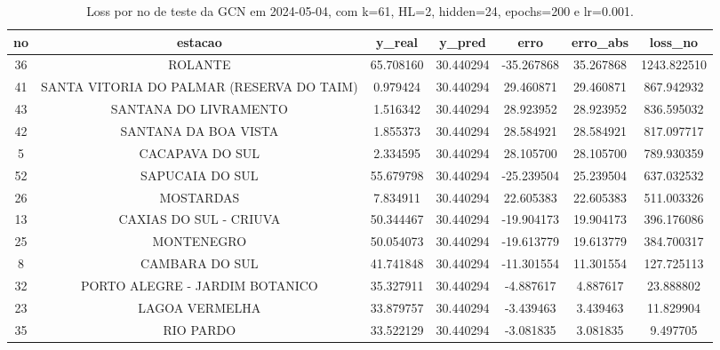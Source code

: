 \begin{table}[h]
\centering
\caption{Loss por no de teste da GCN em 2024-05-04, com k=61, HL=2, hidden=24, epochs=200 e lr=0.001.}
\label{tab:gcn_loss_k61_hl2_h24_e200_d20240504}
\begin{tabular}{ccccccc}
\toprule
no & estacao & y\_real & y\_pred & erro & erro\_abs & loss\_no \\
\midrule
36 & ROLANTE & 65.708160 & 30.440294 & -35.267868 & 35.267868 & 1243.822510 \\
41 & SANTA VITORIA DO PALMAR (RESERVA DO TAIM) & 0.979424 & 30.440294 & 29.460871 & 29.460871 & 867.942932 \\
43 & SANTANA DO LIVRAMENTO & 1.516342 & 30.440294 & 28.923952 & 28.923952 & 836.595032 \\
42 & SANTANA DA BOA VISTA & 1.855373 & 30.440294 & 28.584921 & 28.584921 & 817.097717 \\
5 & CACAPAVA DO SUL & 2.334595 & 30.440294 & 28.105700 & 28.105700 & 789.930359 \\
52 & SAPUCAIA DO SUL & 55.679798 & 30.440294 & -25.239504 & 25.239504 & 637.032532 \\
26 & MOSTARDAS & 7.834911 & 30.440294 & 22.605383 & 22.605383 & 511.003326 \\
13 & CAXIAS DO SUL - CRIUVA & 50.344467 & 30.440294 & -19.904173 & 19.904173 & 396.176086 \\
25 & MONTENEGRO & 50.054073 & 30.440294 & -19.613779 & 19.613779 & 384.700317 \\
8 & CAMBARA DO SUL & 41.741848 & 30.440294 & -11.301554 & 11.301554 & 127.725113 \\
32 & PORTO ALEGRE - JARDIM BOTANICO & 35.327911 & 30.440294 & -4.887617 & 4.887617 & 23.888802 \\
23 & LAGOA VERMELHA & 33.879757 & 30.440294 & -3.439463 & 3.439463 & 11.829904 \\
35 & RIO PARDO & 33.522129 & 30.440294 & -3.081835 & 3.081835 & 9.497705 \\
\bottomrule
\end{tabular}
\end{table}
